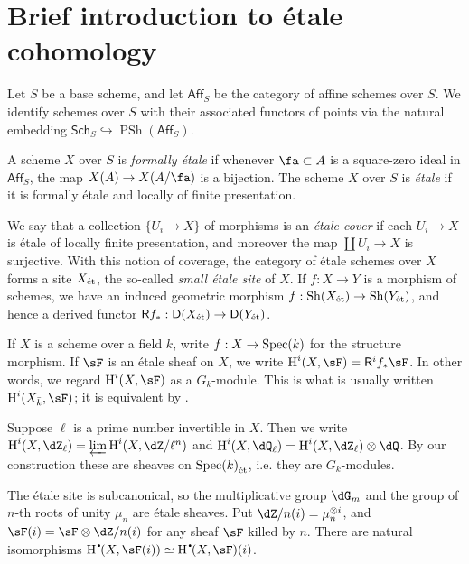 \documentclass{article}
\begin{document}
\appendix
\section{Brief introduction to \'etale cohomology}





Let $S$ be a base scheme, and let $\mathsf{Aff}_S$ be the category of 
affine schemes over $S$. We identify schemes over $S$ with their associated 
functors of points via the natural embedding 
$\mathsf{Sch}_S \hookrightarrow \operatorname{PSh}(\mathsf{Aff}_S)$. 

\begin{definition}
A scheme $X$ over $S$ is \emph{formally \'etale} if whenever 
$\fa\subset A$ is a square-zero ideal in $\mathsf{Aff}_S$, the map 
$X(A) \to X(A/\fa)$ is a bijection. 
The scheme $X$ over $S$ is \emph{\'etale} if it is formally \'etale and 
locally of finite presentation. 
\end{definition}

We say that a collection $\{U_i\to X\}$ of morphisms is an \emph{\'etale 
cover} if each $U_i \to X$ is \'etale of locally finite presentation, and 
moreover the map $\coprod U_i \to X$ is surjective. With this notion of 
coverage, the category of \'etale schemes over $X$ forms a site 
${X}_\textnormal{\'et}$, the so-called \emph{small \'etale site} of $X$. If $f:X\to Y$ is a 
morphism of schemes, we have an induced geometric morphism 
$f:\operatorname{Sh}({X}_\textnormal{\'et}) \to \operatorname{Sh}({Y}_\textnormal{\'et})$, and hence a 
derived functor $\mathsf R f_\ast:\mathsf D({X}_\textnormal{\'et}) \to \mathsf D({Y}_\textnormal{\'et})$. 

If $X$ is a scheme over a field $k$, write $f:X\to \operatorname{Spec}(k)$ for the structure 
morphism. If $\sF$ is an \'etale sheaf on $X$, we write 
$\h^i(X,\sF) = \mathsf R^i f_\ast \sF$. In other words, we regard 
$\h^i(X,\sF)$ as a $G_k$-module. This is what is usually written 
$\h^i(X_{\bar k},\sF)$; it is equivalent by \cite[I 4.1.1]{de77}.

Suppose $\ell$ is a prime number invertible in $X$. Then we write 
$\h^i(X,\dZ_\ell) = \varprojlim \h^i(X,\dZ/\ell^n)$ and 
$\h^i(X,\dQ_\ell) = \h^i(X,\dZ_\ell)\otimes \dQ$. By our construction these 
are sheaves on ${\operatorname{Spec}(k)}_\textnormal{\'et}$, i.e. they are $G_k$-modules. 

The \'etale site is subcanonical, so the multiplicative group $\dG_m$ and the 
group of $n$-th roots of unity $\mu_n$ are \'etale sheaves. Put 
$\dZ/n(i) = \mu_n^{\otimes i}$, and $\sF(i) = \sF\otimes \dZ/n(i)$ for any 
sheaf $\sF$ killed by $n$. There are natural isomorphisms 
$\h^\bullet(X,\sF(i)) \simeq \h^\bullet(X,\sF)(i)$. 












\end{document}
